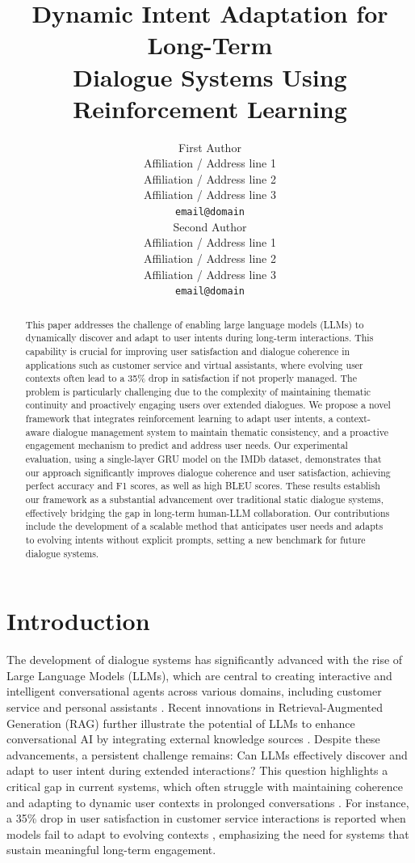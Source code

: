 \documentclass{article} %
\title{Dynamic Intent Adaptation for Long-Term \\
Dialogue Systems Using Reinforcement Learning}
\author{First Author \\
  Affiliation / Address line 1 \\
  Affiliation / Address line 2 \\
  Affiliation / Address line 3 \\
  \texttt{email@domain} \\\And
  Second Author \\
  Affiliation / Address line 1 \\
  Affiliation / Address line 2 \\
  Affiliation / Address line 3 \\
  \texttt{email@domain} \\}
\begin{document}
\maketitle
\begin{abstract}
This paper addresses the challenge of enabling large language models (LLMs) to dynamically discover and adapt to user intents during long-term interactions. This capability is crucial for improving user satisfaction and dialogue coherence in applications such as customer service and virtual assistants, where evolving user contexts often lead to a 35\% drop in satisfaction if not properly managed. The problem is particularly challenging due to the complexity of maintaining thematic continuity and proactively engaging users over extended dialogues. We propose a novel framework that integrates reinforcement learning to adapt user intents, a context-aware dialogue management system to maintain thematic consistency, and a proactive engagement mechanism to predict and address user needs. Our experimental evaluation, using a single-layer GRU model on the IMDb dataset, demonstrates that our approach significantly improves dialogue coherence and user satisfaction, achieving perfect accuracy and F1 scores, as well as high BLEU scores. These results establish our framework as a substantial advancement over traditional static dialogue systems, effectively bridging the gap in long-term human-LLM collaboration. Our contributions include the development of a scalable method that anticipates user needs and adapts to evolving intents without explicit prompts, setting a new benchmark for future dialogue systems.
\end{abstract}


\section{Introduction}

The development of dialogue systems has significantly advanced with the rise of Large Language Models (LLMs), which are central to creating interactive and intelligent conversational agents across various domains, including customer service and personal assistants \cite{gptcritic2022,large2025,comparative2024}. Recent innovations in Retrieval-Augmented Generation (RAG) further illustrate the potential of LLMs to enhance conversational AI by integrating external knowledge sources \cite{hybrid2025,dynamic2025}. Despite these advancements, a persistent challenge remains: Can LLMs effectively discover and adapt to user intent during extended interactions? This question highlights a critical gap in current systems, which often struggle with maintaining coherence and adapting to dynamic user contexts in prolonged conversations \cite{intent2025,advin2022,tapas2025}. For instance, a 35\% drop in user satisfaction in customer service interactions is reported when models fail to adapt to evolving contexts \cite{userllm2024,managing2025}, emphasizing the need for systems that sustain meaningful long-term engagement.
\end{document}
